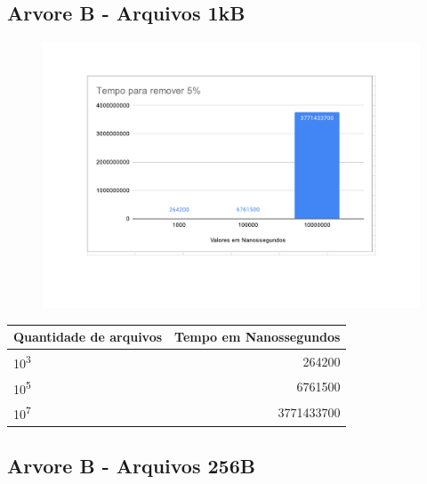 \subsection{Arvore B - Arquivos 1kB}

\begin{figure}[ht]
    \centering
    \includegraphics[scale=0.6]{Trabalho AED/fig/Planilha sem título - Página6.pdf}
    \label{fig:my_label}
\end{figure}
 \begin{center}
        \begin{tabular}{| l | r |}
            \hline
            Quantidade de arquivos & Tempo em Nanossegundos\\
            \hline
            10\textsuperscript{3} & 264200\\
            10\textsuperscript{5} &  6761500\\
            10\textsuperscript{7} &  3771433700 \\
            \hline
        \end{tabular}
    \end{center}
\subsection{Arvore B - Arquivos 256B}

